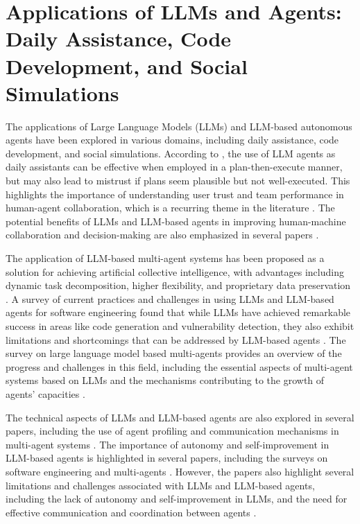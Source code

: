 \documentclass[conference]{IEEEtran}
\begin{document}
\section{Applications of LLMs and Agents: Daily Assistance, Code Development, and Social Simulations}
The applications of Large Language Models (LLMs) and LLM-based autonomous agents have been explored in various domains, including daily assistance, code development, and social simulations. According to \cite{2502.01390}, the use of LLM agents as daily assistants can be effective when employed in a plan-then-execute manner, but may also lead to mistrust if plans seem plausible but not well-executed. This highlights the importance of understanding user trust and team performance in human-agent collaboration, which is a recurring theme in the literature \cite{2408.02479, 2411.14033}. The potential benefits of LLMs and LLM-based agents in improving human-machine collaboration and decision-making are also emphasized in several papers \cite{2310.14985, 2402.01680}.

The application of LLM-based multi-agent systems has been proposed as a solution for achieving artificial collective intelligence, with advantages including dynamic task decomposition, higher flexibility, and proprietary data preservation \cite{2411.14033}. A survey of current practices and challenges in using LLMs and LLM-based agents for software engineering found that while LLMs have achieved remarkable success in areas like code generation and vulnerability detection, they also exhibit limitations and shortcomings that can be addressed by LLM-based agents \cite{2408.02479}. The survey on large language model based multi-agents provides an overview of the progress and challenges in this field, including the essential aspects of multi-agent systems based on LLMs and the mechanisms contributing to the growth of agents' capacities \cite{2402.01680}.

The technical aspects of LLMs and LLM-based agents are also explored in several papers, including the use of agent profiling and communication mechanisms in multi-agent systems \cite{2411.14033}. The importance of autonomy and self-improvement in LLM-based agents is highlighted in several papers, including the surveys on software engineering and multi-agents \cite{2408.02479, 2402.01680}. However, the papers also highlight several limitations and challenges associated with LLMs and LLM-based agents, including the lack of autonomy and self-improvement in LLMs, and the need for effective communication and coordination between agents \cite{2502.01390, 2411.14033}.
\end{document}
